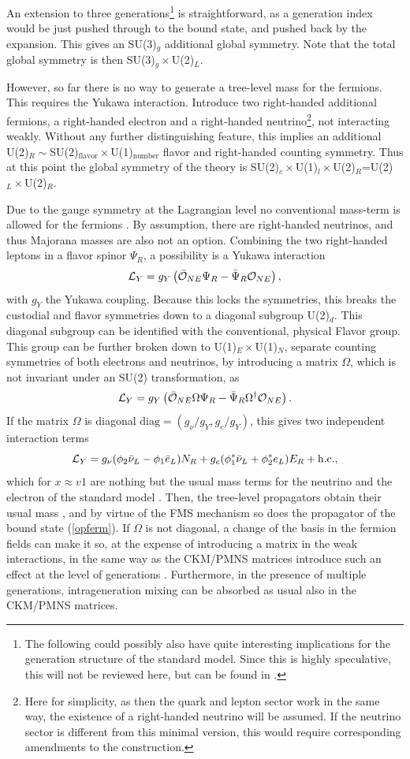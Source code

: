 \documentclass[final,12pt,3p,longtitle]{elsarticle}
\newcommand*{\La}{{\cal{L}}}
\newcommand*{\no}{\noindent}
\newcommand*{\be}{\begin{equation}}
\newcommand*{\ee}{\end{equation}}
\newcommand*{\pref}[1]{(\ref{#1})}
\newcommand*{\nn}{\nonumber}
\newcommand*{\diag}{\mathrm{diag}}
\newcommand*{\1}{1\!\!\!\bot}
\newcommand*{\op}{{\cal O}}
\begin{document}
An extension to three generations\footnote{The following could possibly also have quite interesting implications for the generation structure of the standard model. Since this is highly speculative, this will not be reviewed here, but can be found in \cite{Egger:2017tkd}.} is straightforward, as a generation index would be just pushed through to the bound state, and pushed back by the expansion. This gives an SU(3)$_g$ additional global symmetry. Note that the total global symmetry is then SU(3)$_g\times$U(2)$_L$.

However, so far there is no way to generate a tree-level mass for the fermions. This requires the Yukawa interaction. Introduce two right-handed additional fermions, a right-handed electron and a right-handed neutrino\footnote{Here for simplicity, as then the quark and lepton sector work in the same way, the existence of a right-handed neutrino will be assumed. If the neutrino sector is different from this minimal version, this would require corresponding amendments to the construction.}, not interacting weakly. Without any further distinguishing feature, this implies an additional U(2)$_R\sim$SU(2)$_\text{flavor}\times$U(1)$_\text{number}$ flavor and right-handed counting symmetry. Thus at this point the global symmetry of the theory is SU(2)$_c\times$U(1)$_l\times$U(2)$_R$=U(2)$_L\times$U(2)$_R$.

Due to the gauge symmetry at the Lagrangian level no conventional mass-term is allowed for the fermions \cite{Bohm:2001yx}. By assumption, there are right-handed neutrinos, and thus Majorana masses are also not an option. Combining the two right-handed leptons in a flavor spinor $\Psi_R$, a possibility is a Yukawa interaction
\be
\La_Y=g_Y\left(\bar{\op}_{NE}\Psi_R-\bar{\Psi}_R\op_{NE}\right)\nn,
\ee
\no with $g_Y$ the Yukawa coupling. Because this locks the symmetries, this breaks the custodial and flavor symmetries down to a diagonal subgroup U(2)$_d$. This diagonal subgroup can be identified with the  conventional, physical Flavor group. This group can be further broken down to U(1)$_E\times$U(1)$_N$, separate counting symmetries of both electrons and neutrinos, by introducing a matrix $\Omega$, which is not invariant under an SU(2) transformation, as
\be
\La_Y=g_Y\left(\bar{\op}_{NE}\Omega\Psi_R-\bar{\Psi}_R\Omega^\dagger\op_{NE}\right)\label{yukawa}.
\ee
\no If the matrix $\Omega$ is diagonal $\diag=(g_\nu/g_Y,g_e/g_Y)$, this gives two independent interaction terms
\be
\La_Y=g_\nu(\phi_2\bar{\nu}_L-\phi_1 \bar{e}_L)N_R+g_e(\phi_1^*\bar{\nu}_L+\phi_2^*e_L)E_R+\text{h.c.}\nn,
\ee
\no which for $x\approx v1$ are nothing but the usual mass terms for the neutrino and the electron of the standard model \cite{Bohm:2001yx}. Then, the tree-level propagators obtain their usual mass \cite{Bohm:2001yx}, and by virtue of the FMS mechanism so does the propagator of the bound state \pref{opferm}. If $\Omega$ is not diagonal, a change of the basis in the fermion fields can make it so, at the expense of introducing a matrix in the weak interactions, in the same way as the CKM/PMNS matrices introduce such an effect at the level of generations \cite{Bohm:2001yx}. Furthermore, in the presence of multiple generations, intrageneration mixing can be absorbed as usual also in the CKM/PMNS matrices.
\end{document}
